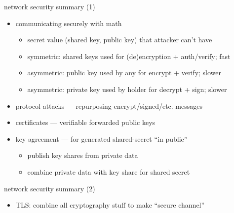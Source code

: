 \begin{frame}{network security summary (1)}
    \begin{itemize}
    \item communicating securely with math
        \begin{itemize}
        \item secret value (shared key, public key) that attacker can't have
        \item symmetric: shared keys used for (de)encryption + auth/verify; fast
        \item asymmetric: public key used by any for encrypt + verify; slower
        \item asymmetric: private key used by holder for decrypt + sign; slower
        \end{itemize}
    \item protocol attacks --- repurposing encrypt/signed/etc. messages
    \item certificates --- verifiable forwarded public keys
    \item key agreement --- for generated shared-secret ``in public''
        \begin{itemize}
        \item publish key shares from private data
        \item combine private data with key share for shared secret
        \end{itemize}
    \end{itemize}
\end{frame}

\begin{frame}{network security summary (2)}
    \begin{itemize}
    \item TLS: combine all cryptography stuff to make ``secure channel''
    \end{itemize}
\end{frame}
